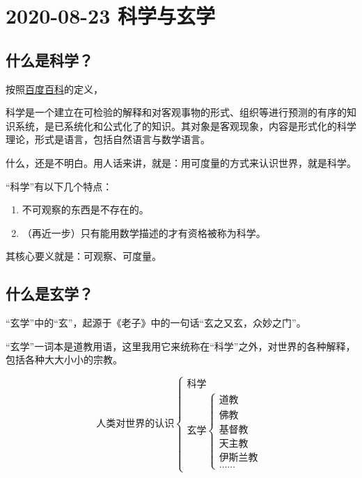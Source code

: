 \section{2020-08-23 科学与玄学}

\subsection{什么是科学？}

按照\href{https://baike.baidu.com/item/%E7%A7%91%E5%AD%A6/10406}{百度百科}的定义，

\begin{screen}
    科学是一个建立在可检验的解释和对客观事物的形式、组织等进行预测的有序的知识系统，是已系统化和公式化了的知识。其对象是客观现象，内容是形式化的科学理论，形式是语言，包括自然语言与数学语言。
\end{screen}

什么，还是不明白。用人话来讲，就是：用可度量的方式来认识世界，就是科学。

“科学”有以下几个特点：

\begin{enumerate}[nosep, left=\parindent]
    \item 不可观察的东西是不存在的。
    \item （再近一步）只有能用数学描述的才有资格被称为科学。
\end{enumerate}

其核心要义就是：可观察、可度量。

\subsection{什么是玄学？}

“玄学”中的“玄”，起源于《老子》中的一句话“玄之又玄，众妙之门”。

“玄学”一词本是道教用语，这里我用它来统称在“科学”之外，对世界的各种解释，包括各种大大小小的宗教。

$$
\text{人类对世界的认识}
\begin{cases}
    \text{科学} \\
    \text{玄学}
    \begin{cases}
        \text{道教} \\
        \text{佛教} \\
        \text{基督教} \\
        \text{天主教} \\
        \text{伊斯兰教} \\
        \text{……}
    \end{cases}
\end{cases}
$$

